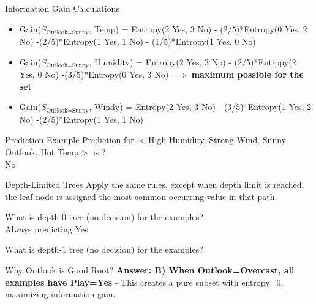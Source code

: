 \documentclass[usenames,dvipsnames]{beamer}
\begin{document}
\begin{frame}{Information Gain Calculations}
\begin{itemize}
\item Gain($S_{\text{Outlook=Sunny}}$, Temp) = Entropy(2 Yes, 3 No) - (2/5)*Entropy(0 Yes, 2 No) -(2/5)*Entropy(1 Yes, 1 No) - (1/5)*Entropy(1 Yes, 0 No) 
	\pause \item Gain($S_{\text{Outlook=Sunny}}$, Humidity) = Entropy(2 Yes, 3 No) - (2/5)*Entropy(2 Yes, 0 No) -(3/5)*Entropy(0 Yes, 3 No) $\implies$ \textbf{maximum possible for the set}
	\pause \item Gain($S_{\text{Outlook=Sunny}}$, Windy) = Entropy(2 Yes, 3 No) - (3/5)*Entropy(1 Yes, 2 No) -(2/5)*Entropy(1 Yes, 1 No) 
\end{itemize}
\end{frame}

\begin{frame}{Prediction Example}
Prediction for $<$High Humidity, Strong Wind, Sunny Outlook, Hot Temp$>$ is ? \\
\pause  No
\end{frame}

\begin{frame}{Depth-Limited Trees}
Apply the same rules, except when depth limit is reached, the leaf node is assigned the most common occurring value in that path.

\pause What is depth-$0$ tree (no decision) for the examples? \\
\pause Always predicting Yes

\pause What is depth-$1$ tree (no decision) for the examples? \\
\pause {}

\end{frame}

\begin{frame}{Why Outlook is Good Root?}
\textbf{Answer: B) When Outlook=Overcast, all examples have Play=Yes} - This creates a pure subset with entropy=0, maximizing information gain.
\end{frame}
\end{document}
